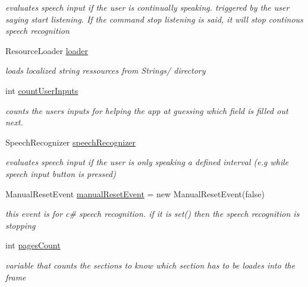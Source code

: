\begin{DoxyCompactItemize}
\begin{DoxyCompactList}\small\item\em evaluates speech input if the user is continually speaking. triggered by the user saying start listening. If the command stop listening is said, it will stop continous speech recognition \end{DoxyCompactList}\item 
Resource\+Loader \mbox{\hyperlink{class_listen_to_me_1_1_main_page_a906eb7f1e61084dcfb0b0f833b0d96f4}{loader}}
\begin{DoxyCompactList}\small\item\em loads localized string ressources from Strings/ directory \end{DoxyCompactList}\item 
int \mbox{\hyperlink{class_listen_to_me_1_1_main_page_a94ae31ea5ea90fff0194c7c3345e3987}{count\+User\+Inputs}}
\begin{DoxyCompactList}\small\item\em counts the user\textquotesingle{}s inputs for helping the app at guessing which field is filled out next. \end{DoxyCompactList}\item 
Speech\+Recognizer \mbox{\hyperlink{class_listen_to_me_1_1_main_page_a56393ec41c67e438e12651f5dc44a2cc}{speech\+Recognizer}}
\begin{DoxyCompactList}\small\item\em evaluates speech input if the user is only speaking a defined interval (e.\+g while speech input button is pressed) \end{DoxyCompactList}\item 
Manual\+Reset\+Event \mbox{\hyperlink{class_listen_to_me_1_1_main_page_acc2116e019bacfa54fd25381eeaf363f}{manual\+Reset\+Event}} = new Manual\+Reset\+Event(false)
\begin{DoxyCompactList}\small\item\em this event is for c\# speech recognition. if it is set() then the speech recognition is stopping \end{DoxyCompactList}\item 
int \mbox{\hyperlink{class_listen_to_me_1_1_main_page_afa885f51f46e84b050d0874e64389880}{pages\+Count}}
\begin{DoxyCompactList}\small\item\em variable that counts the sections to know which section has to be loades into the frame \end{DoxyCompactList}\item 

\end{DoxyCompactItemize}
